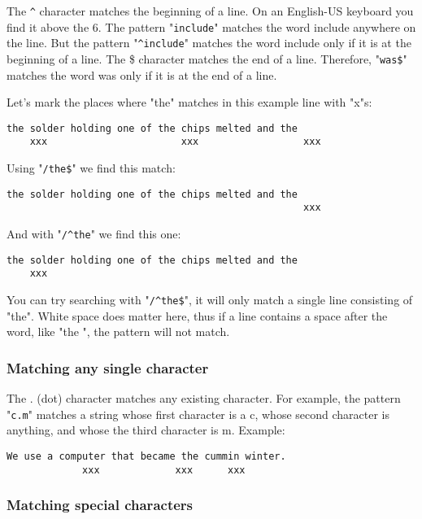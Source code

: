 The \verb!^! character matches the beginning of a line.
On an English-US keyboard you find it above the 6.
The pattern "\verb!include!" matches the word include anywhere on the line.
But the pattern "\verb!^include!" matches the word include only if it is at the beginning of a line.
The \$ character matches the end of a line.
Therefore, "\verb!was$!" matches the word was only if it is at the end of a line.

Let's mark the places where "the" matches in this example line with "x"s:

		\begin{Verbatim}[samepage=true]
    the solder holding one of the chips melted and the 
    xxx                       xxx                  xxx
		\end{Verbatim}

Using "\verb!/the$!" we find this match:

		\begin{Verbatim}[samepage=true]
    the solder holding one of the chips melted and the 
                                                   xxx
		\end{Verbatim}

And with "\verb!/^the!" we find this one:

		\begin{Verbatim}[samepage=true]
    the solder holding one of the chips melted and the 
    xxx
		\end{Verbatim}

You can try searching with "\verb!/^the$!", it will only match a single line consisting of "the".
White space does matter here, thus if a line contains a space after the word, like "the ", the pattern will not match.

\subsubsection{Matching any single character}

The . (dot) character matches any existing character.
For example, the pattern "\verb!c.m!" matches a string whose first character is a c, whose second character is anything, and whose the third character is m.
Example:

		\begin{Verbatim}[samepage=true]
    We use a computer that became the cummin winter. 
             xxx             xxx      xxx
		\end{Verbatim}


\subsubsection{Matching special characters}

